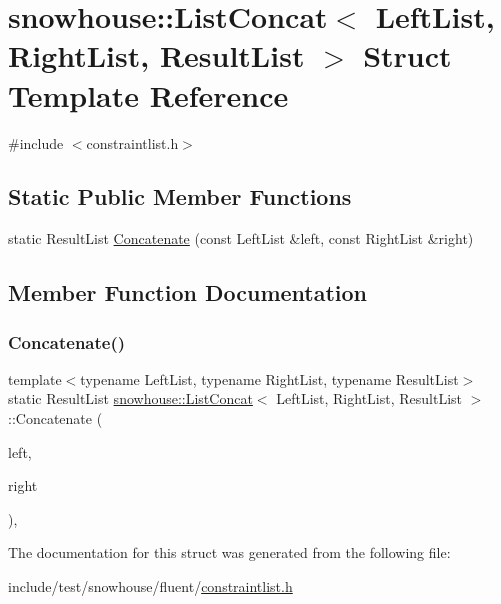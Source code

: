 \hypertarget{structsnowhouse_1_1ListConcat}{}\section{snowhouse\+::List\+Concat$<$ Left\+List, Right\+List, Result\+List $>$ Struct Template Reference}
\label{structsnowhouse_1_1ListConcat}


{\ttfamily \#include $<$constraintlist.\+h$>$}

\subsection*{Static Public Member Functions}
\begin{DoxyCompactItemize}
\item 
static Result\+List \mbox{\hyperlink{structsnowhouse_1_1ListConcat_a2e0743a34399ff40669ee6010d2789ea}{Concatenate}} (const Left\+List \&left, const Right\+List \&right)
\end{DoxyCompactItemize}


\subsection{Member Function Documentation}
\mbox{\label{structsnowhouse_1_1ListConcat_a2e0743a34399ff40669ee6010d2789ea}} 
\subsubsection{\texorpdfstring{Concatenate()}{Concatenate()}}
{\footnotesize\ttfamily template$<$typename Left\+List, typename Right\+List, typename Result\+List$>$ \\
static Result\+List \mbox{\hyperlink{structsnowhouse_1_1ListConcat}{snowhouse\+::\+List\+Concat}}$<$ Left\+List, Right\+List, Result\+List $>$\+::Concatenate (\begin{DoxyParamCaption}\item[{const Left\+List \&}]{left,  }\item[{const Right\+List \&}]{right }\end{DoxyParamCaption})\hspace{0.3cm}{\ttfamily [inline]}, {\ttfamily [static]}}



The documentation for this struct was generated from the following file\+:\begin{DoxyCompactItemize}
\item 
include/test/snowhouse/fluent/\mbox{\hyperlink{constraintlist_8h}{constraintlist.\+h}}\end{DoxyCompactItemize}
